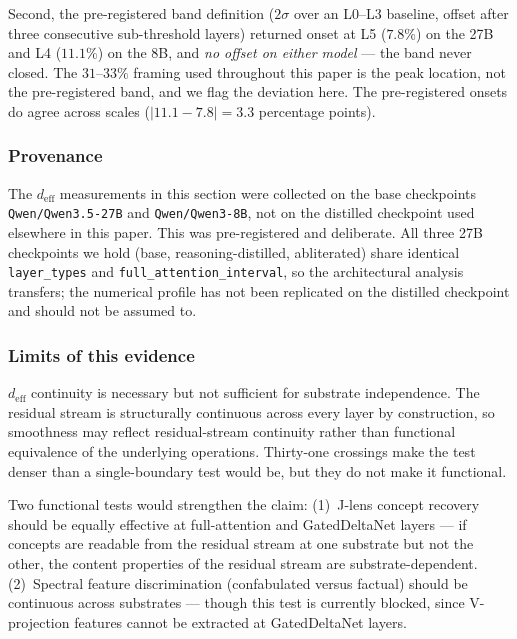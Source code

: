 Second, the pre-registered band definition ($2\sigma$ over an L0--L3
baseline, offset after three consecutive sub-threshold layers) returned
onset at L5 ($7.8\%$) on the 27B and L4 ($11.1\%$) on the 8B, and
\emph{no offset on either model} --- the band never closed. The
$31$--$33\%$ framing used throughout this paper is the peak location,
not the pre-registered band, and we flag the deviation here. The
pre-registered onsets do agree across scales ($|11.1 - 7.8| = 3.3$
percentage points).

\subsubsection{Provenance}

The $d_\text{eff}$ measurements in this section were collected on the
base checkpoints \texttt{Qwen/Qwen3.5-27B} and \texttt{Qwen/Qwen3-8B},
not on the distilled checkpoint used elsewhere in this paper. This was
pre-registered and deliberate. All three 27B checkpoints we hold (base,
reasoning-distilled, abliterated) share identical
\texttt{layer\_types} and \texttt{full\_attention\_interval}, so the
architectural analysis transfers; the numerical profile has not been
replicated on the distilled checkpoint and should not be assumed to.

\subsubsection{Limits of this evidence}

$d_\text{eff}$ continuity is necessary but not sufficient for
substrate independence. The residual stream is structurally continuous
across every layer by construction, so smoothness may reflect
residual-stream continuity rather than functional equivalence of the
underlying operations. Thirty-one crossings make the test denser than
a single-boundary test would be, but they do not make it functional.

Two functional tests would strengthen the claim: (1)~J-lens concept
recovery should be equally effective at full-attention and
GatedDeltaNet layers --- if concepts are readable from the residual
stream at one substrate but not the other, the content properties
of the residual stream are substrate-dependent. (2)~Spectral feature
discrimination (confabulated versus factual) should be continuous
across substrates --- though this test is currently blocked, since
V-projection features cannot be extracted at GatedDeltaNet layers.

